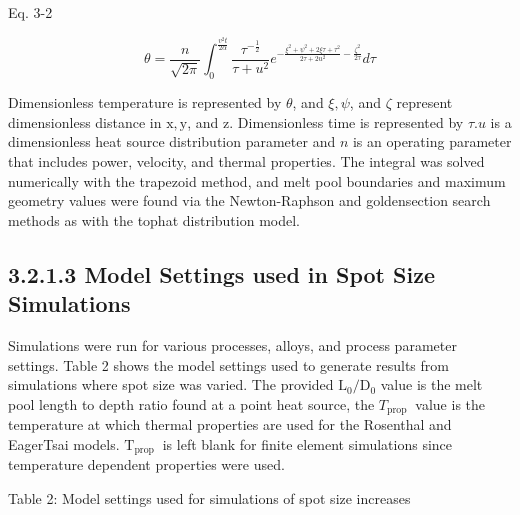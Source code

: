 \documentclass[10pt]{article}
\begin{document}
Eq. 3-2

$$
\theta=\frac{n}{\sqrt{2 \pi}} \int_{0}^{\frac{v^{2} t}{2 \alpha}} \frac{\tau^{-\frac{1}{2}}}{\tau+u^{2}} e^{-\frac{\xi^{2}+\psi^{2}+2 \xi \tau+\tau^{2}}{2 \tau+2 u^{2}}-\frac{\zeta^{2}}{2 \tau}} d \tau
$$

Dimensionless temperature is represented by $\theta$, and $\xi, \psi$, and $\zeta$ represent dimensionless distance in $\mathrm{x}, \mathrm{y}$, and $\mathrm{z}$. Dimensionless time is represented by $\tau . u$ is a dimensionless heat source distribution parameter and $n$ is an operating parameter that includes power, velocity, and thermal properties. The integral was solved numerically with the trapezoid method, and melt pool boundaries and maximum geometry values were found via the Newton-Raphson and goldensection search methods as with the tophat distribution model.

\subsection*{3.2.1.3 Model Settings used in Spot Size Simulations}
Simulations were run for various processes, alloys, and process parameter settings. Table 2 shows the model settings used to generate results from simulations where spot size was varied. The provided $\mathrm{L}_{0} / \mathrm{D}_{0}$ value is the melt pool length to depth ratio found at a point heat source, the $T_{\text {prop }}$ value is the temperature at which thermal properties are used for the Rosenthal and EagerTsai models. $\mathrm{T}_{\text {prop }}$ is left blank for finite element simulations since temperature dependent properties were used.

Table 2: Model settings used for simulations of spot size increases
\end{document}
